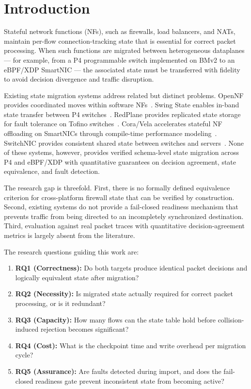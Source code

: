 \documentclass[10pt, conference, compsoc]{IEEEtran}
\begin{document}
\section{Introduction}
\label{sec:introduction}

Stateful network functions (NFs), such as firewalls, load balancers, and NATs,
maintain per-flow connection-tracking state that is essential for correct packet
processing. When such functions are migrated between heterogeneous dataplanes
--- for example, from a P4 programmable switch implemented on BMv2 to an
eBPF/XDP SmartNIC --- the associated state must be transferred with fidelity to
avoid decision divergence and traffic disruption.

Existing state migration systems address related but distinct problems. OpenNF
provides coordinated moves within software NFs~\cite{gember2014opennf}.
Swing State enables in-band state transfer between P4 switches~\cite{luo2017swing}.
RedPlane provides replicated state storage for fault tolerance on Tofino
switches~\cite{kim2021redplane}. Cora/Vela accelerates stateful NF offloading on
SmartNICs through compile-time performance modeling~\cite{xi2024cora}. SwitchNIC
provides consistent shared state between switches and servers~\cite{lei2025switchnic}.
None of these systems, however, provides verified schema-level state migration
across P4 and eBPF/XDP with quantitative guarantees on decision agreement,
state equivalence, and fault detection.

The research gap is threefold. First, there is no formally defined equivalence
criterion for cross-platform firewall state that can be verified by construction.
Second, existing systems do not provide a fail-closed readiness mechanism that
prevents traffic from being directed to an incompletely synchronized destination.
Third, evaluation against real packet traces with quantitative decision-agreement
metrics is largely absent from the literature.

The research questions guiding this work are:

\begin{enumerate}
    \item \textbf{RQ1 (Correctness):} Do both targets produce identical packet
          decisions and logically equivalent state after migration?
    \item \textbf{RQ2 (Necessity):} Is migrated state actually required for
          correct packet processing, or is it redundant?
    \item \textbf{RQ3 (Capacity):} How many flows can the state table hold
          before collision-induced rejection becomes significant?
    \item \textbf{RQ4 (Cost):} What is the checkpoint time and write overhead
          per migration cycle?
    \item \textbf{RQ5 (Assurance):} Are faults detected during import, and
          does the fail-closed readiness gate prevent inconsistent state from
          becoming active?
\end{enumerate}
\end{document}
